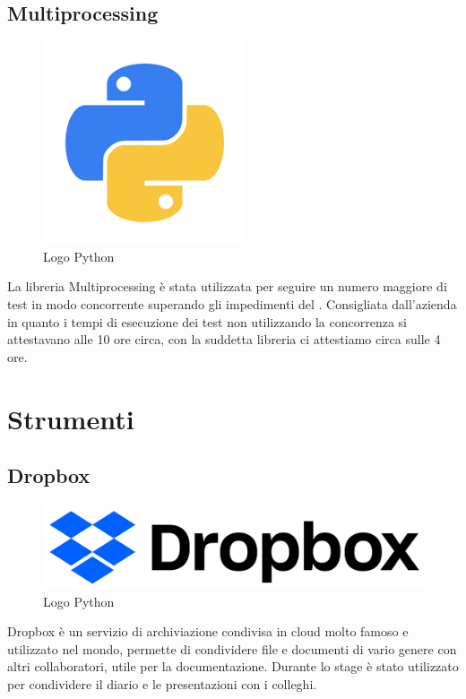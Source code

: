 \subsection{Multiprocessing}
\begin{figure}[H]
	\begin{center} \includegraphics[scale=0.5]{figures/python}
		\caption[Bin packing figures]{Logo Python}  
	\end{center}
\end{figure}
La libreria Multiprocessing è stata utilizzata per seguire un numero maggiore di test in modo concorrente superando gli impedimenti del . Consigliata dall'azienda in quanto i tempi di esecuzione dei test non utilizzando la concorrenza si attestavano alle 10 ore circa, con la suddetta libreria ci attestiamo circa sulle 4 ore.

\section{Strumenti}
\subsection{Dropbox}
\begin{figure}[H]
	\begin{center} \includegraphics[scale=0.2]{figures/dropbox_2017_logo}
		\caption[Bin packing figures]{Logo Python}  
	\end{center}
\end{figure}
Dropbox è un servizio di archiviazione condivisa in cloud molto famoso e utilizzato nel mondo, permette di condividere file e documenti di vario genere con altri collaboratori, utile per la documentazione. Durante lo stage è stato utilizzato per condividere il diario e le presentazioni con i colleghi.

